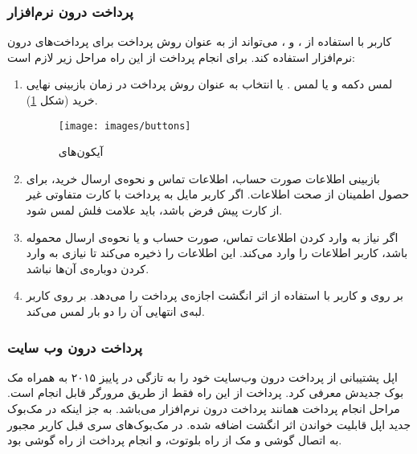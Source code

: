 \documentclass[oneside]{report}
\begin{document}
	\subsubsection{ پرداخت درون نرم‌افزار   }
	کاربر با استفاده از 
		 									{\normalsize {}}،
		 									 									{\normalsize {}} و
		 	 									{\normalsize {}} ،
		 	 									می‌تواند از 
		 	 									 									{\normalsize {}}
		 	 									 									به عنوان روش پرداخت برای پرداخت‌های درون نرم‌افزار استفاده کند. برای انجام پرداخت از این راه مراحل زیر لازم است:
	\begin{enumerate}
		\item لمس دکمه
			 									{\normalsize {}}
			 									  و یا لمس
			 									{\normalsize {}}.
			 									یا انتخاب
			 									 									{\normalsize {}}
به عنوان روش پرداخت در زمان بازبینی نهایی خرید (شکل \ref{buttons}).
\begin{figure}[h]
	\centering
	\texttt{[image: images/buttons]}
	\caption{آیکون‌های {\footnotesize {}} ‌}
	\label{buttons}
\end{figure}


	\item بازبینی اطلاعات صورت حساب، اطلاعات تماس و نحوه‌ی ارسال خرید، برای حصول اطمینان از صحت اطلاعات.
	اگر کاربر مایل به پرداخت با کارت متفاوتی غیر از کارت پیش فرض ‌باشد،   باید علامت فلش لمس شود.
	\item اگر نیاز به وارد کردن اطلاعات تماس، صورت حساب و یا نحوه‌ی ارسال محموله ‌باشد، کاربر اطلاعات را وارد می‌کند.
	 									{\normalsize {}} 
	 									این اطلاعات را ذخیره می‌کند تا نیازی به وارد کردن دوباره‌ی آن‌ها نباشد.
	\item بر روی 
	 									{\normalsize {}}
	 									و 
	 									 {\normalsize {}}
	 								کاربر با استفاده از اثر انگشت اجازه‌ی پرداخت را می‌دهد.
	 								بر روی  									{\normalsize {}}									 									 									کاربر لبه‌ی انتهایی آن را دو بار لمس می‌کند.
	\end{enumerate}
		
		
	\subsubsection{ پرداخت درون  وب سایت}
	اپل پشتیبانی از پرداخت درون وب‌سایت خود را به تازگی در پاییز ۲۰۱۵ به همراه مک ‌بوک جدیدش معرفی کرد. پرداخت از این راه فقط از طریق مرورگر 
		 									 {\normalsize {}}
		 									 قابل انجام است. مراحل انجام پرداخت همانند پرداخت درون نرم‌افزار می‌باشد. به جز اینکه در مک‌بوک جدید اپل قابلیت خواندن اثر انگشت اضافه شده. در مک‌بوک‌های سری قبل کاربر مجبور به اتصال گوشی و مک از راه بلوتوث، و انجام پرداخت از راه گوشی بود.
		 									 
\end{document}
